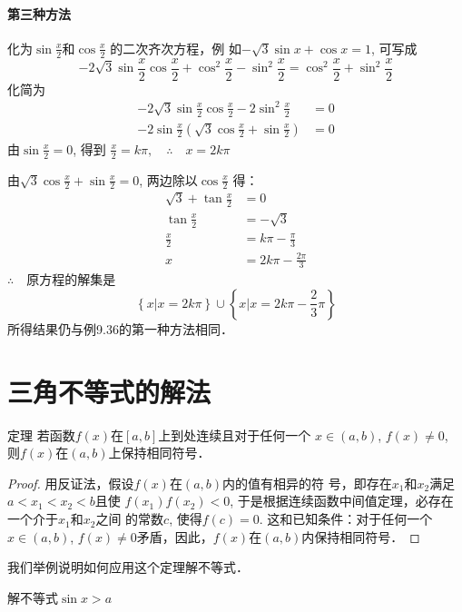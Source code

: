 \paragraph{第三种方法} 化为$\sin\frac{x}{2}$和$\cos \frac{x}{2}$
的二次齐次方程，例
如$-\sqrt{3}\sin x+\cos x=1$, 可写成
\[-2\sqrt{3}\sin\frac{x}{2}\cos \frac{x}{2}+\cos^2\frac{x}{2}-\sin^2\frac{x}{2}=\cos^2\frac{x}{2}+\sin^2\frac{x}{2}\]
化简为
\[\begin{split}
    -2\sqrt{3}\sin\frac{x}{2}\cos\frac{x}{2}-2\sin^2\frac{x}{2}&=0\\
    -2\sin\frac{x}{2}\left(\sqrt{3}\cos\frac{x}{2}+\sin\frac{x}{2}\right)&=0
\end{split}\]
由$\sin\frac{x}{2}=0$, 得到
$\frac{x}{2}=k\pi ,\quad \therefore\quad x=2k\pi $

由$\sqrt{3}\cos\frac{x}{2}+\sin \frac{x}{2}=0$, 两边除以$\cos\frac{x}{2}$
得：
\[\begin{split}
    \sqrt{3}+\tan\frac{x}{2} &=0\\
    \tan\frac{x}{2}&=-\sqrt{3}\\
    \frac{x}{2}&=k\pi-\frac{\pi}{3}\\
    x&=2k\pi-\frac{2\pi}{3}
\end{split}\]
$\therefore\quad $原方程的解集是
\[\left\{x\big|x=2k\pi\right\}\cup \left\{x\big|x=2k\pi-\frac{2}{3}\pi\right\}\]
所得结果仍与例9.36的第一种方法相同．

\section{三角不等式的解法}
\begin{blk}{定理}
    若函数$f(x)$在$[a,b]$上到处连续且对于任何一个
$x\in (a,b)$, $f(x)\ne 0$, 则$f(x)$在$(a,b)$上保持相同符号．
\end{blk}

\begin{proof}
    用反证法，假设$f(x)$在$(a,b)$内的值有相异的符
号，即存在$x_1$和$x_2$满足$a<x_1<x_2<b$且使
$f(x_1)f(x_2)<0$,
于是根据连续函数中间值定理，必存在一个介于$x_1$和$x_2$之间
的常数$c$, 使得$f(c)=0$. 这和已知条件：对于任何一个$x\in
(a,b)$, $f(x)\ne 0$矛盾，因此，$f(x)$在$(a,b)$内保持相同符号．
\end{proof}

我们举例说明如何应用这个定理解不等式．


\begin{example}
    解不等式$\sin x>a$
\end{example}


